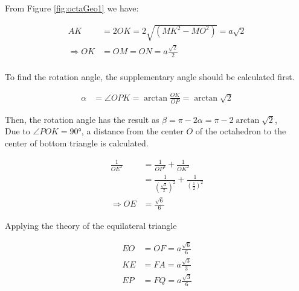 
\noindent From Figure \ref{fig:octaGeo1} we have:

\begin{equation*} 
\label{octa:eq0}
\begin{split}
AK & = 2OK = 2\sqrt{(MK^2-MO^2)} = a\sqrt{2}\\
\Rightarrow OK & = OM = ON = a\frac{\sqrt{2}}{2}\\
\end{split}
\end{equation*}

\noindent To find the rotation angle, the supplementary angle should be calculated first. 

\begin{equation*} 
\label{octa:eq2}
\begin{split}
\alpha & = \angle OPK = \arctan{\frac{OK}{OP}} = \arctan{\sqrt{2}}
\end{split}
\end{equation*}

\noindent Then, the rotation angle has the result as  $\beta = \pi-2\alpha = \pi-2\arctan{\sqrt{2}}$, \\

\noindent Due to $\angle POK=\ang{90}$, a distance from the center $O$ of the octahedron to the center of bottom triangle is calculated.

\begin{equation*} 
\label{octa:eq3}
\begin{split}
\frac{1}{OE^2} & = \frac{1}{OP^2}+\frac{1}{OK^2}\\
			   & = \frac{1}{(\frac{\sqrt{2}}{2})^2}+\frac{1}{(\frac{1}{2})^2}\\
\Rightarrow OE & = \frac{\sqrt{6}}{6}
\end{split}
\end{equation*}

\noindent Applying the theory of the equilateral triangle

\begin{equation*} 
\label{octa:eq4}
\begin{split}
EO & = OF = a\frac{\sqrt{6}}{6}\\
KE & = FA = a\frac{\sqrt{3}}{3}\\
EP & = FQ = a\frac{\sqrt{3}}{6}
\end{split}
\end{equation*}

